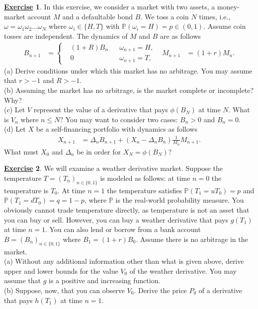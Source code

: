 \documentclass[12pt]{book}
\numberwithin{equation}{chapter}
\theoremstyle{plain}
\numberwithin{theorem}{section}
\theoremstyle{definition}
\newtheorem{exercise}{\underline{Exercise}}
\numberwithin{exercise}{chapter}
\newcommand{\<}{\langle}
\renewcommand{\>}{\rangle}
\renewcommand{\(}{\left(}
\renewcommand{\)}{\right)}
\renewcommand{\[}{\left[}
\renewcommand{\]}{\right]}
\newcommand\Pb{\mathds{P}}
\newcommand\om{\omega}
\newcommand\Del{\Delta}
\theoremstyle{definition}
\numberwithin{question}{section}
\begin{document}
\begin{exercise}
\label{exer:3-3}
In this exercise, we consider a market with two assets, a money-market account $M$ and a defaultable bond $B$.  We toss a coin $N$ times, i.e., $\om = \om_1 \om_2 \ldots \om_N$ where $\om_i \in \{H,T\}$ with $\Pb(\om_i=H)=p \in (0,1)$.  Assume coin tosses are independent.  The dynamics of $M$ and $B$ are as follows
\begin{align}
B_{n+1}
	&=	\left\{ \begin{aligned}
			&(1+R) B_n && \om_{n+1} = H , \\
			&0					&& \om_{n+1} = T ,
			\end{aligned} \right. &
M_{n+1}
	&=	(1+r) M_n .
\end{align}
(a) Derive conditions under which this market has no arbitrage.  You may assume that $r > -1$ and $R > -1$.  \\[0.5em]
(b) Assuming the market has no arbitrage, is the market complete or incomplete?  Why?\\[0.5em]
(c) Let $V$ represent the value of a derivative that pays $\phi(B_N)$ at time $N$.  What is $V_n$ where $n \leq N$?  You may want to consider two cases: $B_n > 0$ and $B_n = 0$.\\[0.5em]
(d) Let $X$ be a self-financing portfolio with dynamics as follows
\begin{align}
X_{n+1}
	&=	\Del_n B_{n+1} + (X_n - \Del_n B_n) \frac{1}{M_n}M_{n+1}.
\end{align}
What must $X_0$ and $\Del_n$ be in order for $X_N = \phi(B_N)$?
\end{exercise}

\begin{exercise}
\label{exer:3-4}
We will examine a weather derivative market.
Suppose the temperature $T=(T_n)_{n \in \{0,1\}}$ is modeled as follows: at time $n=0$ the temperature is $T_0$.  At time $n=1$ the temperature satisfies $\Pb(T_1 = u T_0) = p$ and $\Pb(T_1 = d T_0 ) = q = 1-p$, where $\Pb$ is the real-world probability measure.  You obviously cannot trade temperature directly, as temperature is not an asset that you can buy or sell.  However, you can buy a weather derivative that pays $g(T_1)$ at time $n=1$.  You can also lend or borrow from a bank account $B = (B_n)_{n \in \{0,1\}}$ where $B_1 = (1+r) B_0$.  Assume there is no arbitrage in the market.  
 \\[0.5em]
(a) Without any additional information other than what is given above, derive upper and lower bounds for the value $V_0$ of the weather derivative.  You may assume that $g$ is a positive and increasing function.
 \\[0.5em]
(b) Suppose, now, that you can observe $V_0$.  Derive the price $P_0$ of a derivative that pays $h(T_1)$ at time $n=1$.
\end{exercise}
\end{document}
